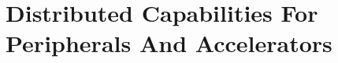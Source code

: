 \section{Distributed Capabilities For Peripherals And Accelerators} %




% 
% 
% 
% 
% 
% 
% 
% 
% 
% 


